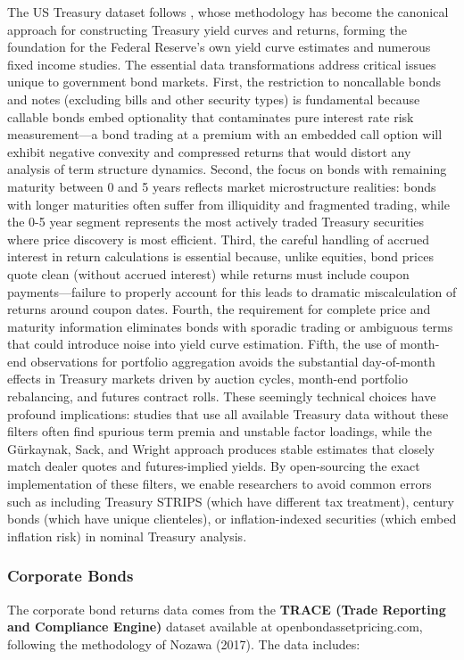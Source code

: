 \documentclass{article}
\begin{document}
\begin{appendices}
The US Treasury dataset follows \cite{Gurkaynak2007}, whose methodology has become the canonical approach for constructing Treasury yield curves and returns, forming the foundation for the Federal Reserve's own yield curve estimates and numerous fixed income studies. The essential data transformations address critical issues unique to government bond markets. First, the restriction to noncallable bonds and notes (excluding bills and other security types) is fundamental because callable bonds embed optionality that contaminates pure interest rate risk measurement—a bond trading at a premium with an embedded call option will exhibit negative convexity and compressed returns that would distort any analysis of term structure dynamics. Second, the focus on bonds with remaining maturity between 0 and 5 years reflects market microstructure realities: bonds with longer maturities often suffer from illiquidity and fragmented trading, while the 0-5 year segment represents the most actively traded Treasury securities where price discovery is most efficient. Third, the careful handling of accrued interest in return calculations is essential because, unlike equities, bond prices quote clean (without accrued interest) while returns must include coupon payments—failure to properly account for this leads to dramatic miscalculation of returns around coupon dates. Fourth, the requirement for complete price and maturity information eliminates bonds with sporadic trading or ambiguous terms that could introduce noise into yield curve estimation. Fifth, the use of month-end observations for portfolio aggregation avoids the substantial day-of-month effects in Treasury markets driven by auction cycles, month-end portfolio rebalancing, and futures contract rolls. These seemingly technical choices have profound implications: studies that use all available Treasury data without these filters often find spurious term premia and unstable factor loadings, while the Gürkaynak, Sack, and Wright approach produces stable estimates that closely match dealer quotes and futures-implied yields. By open-sourcing the exact implementation of these filters, we enable researchers to avoid common errors such as including Treasury STRIPS (which have different tax treatment), century bonds (which have unique clienteles), or inflation-indexed securities (which embed inflation risk) in nominal Treasury analysis.

\subsubsection{Corporate Bonds}
\label{sec:corporate_bonds}
The corporate bond returns data comes from the \textbf{TRACE (Trade Reporting and Compliance Engine)} dataset available at openbondassetpricing.com, following the methodology of Nozawa (2017). The data includes:


\end{appendices}
\end{document}
